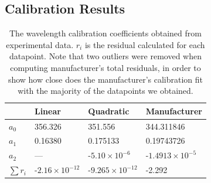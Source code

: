 \documentclass[authoryear,12pt,5p,times]{elsarticle}
\begin{document}
\begin{appendices}
\vspace{-10pt}
\section{Calibration Results}
\vspace{-10pt}
\begin{table}[h!]
    \begin{tabular}{|l|l|l|l|}
    \hline
    ~                            & Linear                             & Quadratic                        & Manufacturer\\ \hline
    $a_0$                     & 356.326                              & 351.556                              & 344.311846                              \\ \hline
    $a_1$                     & 0.16380                              & 0.175133                             & 0.19743726                              \\ \hline
    $a_2$                     & ---                                  & -$5.10\times10^{-6}$   &-$1.4913\times10^{-5}$    \\ \hline
    $\sum r_i$ & -$2.16\times10^{-12}$ & -$9.265\times10^{-12}$ & -2.292                                  \\ \hline
    \end{tabular}
    \label{table} \caption{The wavelength calibration coefficients obtained from experimental data. $r_i$ is the residual calculated for each datapoint. Note that two outliers were removed when computing manufacturer's total residuals, in order to show how close does the manufacturer's calibration fit with the majority of the datapoints we obtained.}
\end{table}
\end{appendices}
\end{document}
